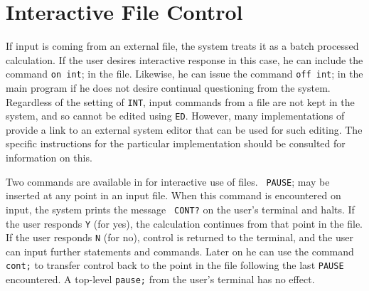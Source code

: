 \section{Interactive File Control}
If input is coming from an external file, the system treats it as a batch
processed calculation.  If the user desires interactive
 response in this case, he can include the command
{\tt on int}; in the file.  Likewise, he can issue the
command {\tt off int}; in the main program if he does not desire continual
questioning from the system.  Regardless of the setting of {\tt INT},
input commands from a file are not kept in the system, and so cannot be
edited using {\tt ED}.  However, many implementations of {\REDUCE} provide
a link to an external system editor that can be used for such editing.
The specific instructions for the particular implementation should be
consulted for information on this.

Two commands are available in {\REDUCE} for interactive use of files. {\tt
PAUSE}; may be inserted at any point in an input file.  When
this command is encountered on input, the system prints the message {\tt
CONT?} on the user's terminal and halts.  If the user responds {\tt Y}
(for yes), the calculation continues from that point in the file.  If the
user responds {\tt N} (for no), control is returned to the terminal, and
the user can input further statements and commands.  Later on he can use
the command {\tt cont;} to transfer control back to the
point in the file following the last {\tt PAUSE} encountered.  A top-level
{\tt pause;} from the user's terminal has no effect.


